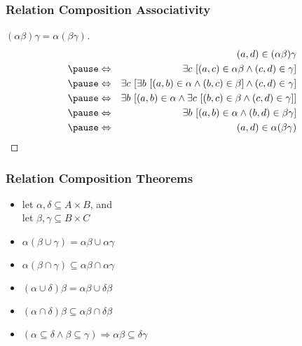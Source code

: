 \documentclass[dvipsnames]{beamer}
\begin{document}
\begin{frame}
  \frametitle{Relation Composition Associativity}

  \begin{proof}[$(\alpha \beta) \gamma = \alpha (\beta \gamma)$]
    \pause
    \begin{eqnarray*}
      &                 & (a,d) \in (\alpha \beta)\gamma\\\pause
      & \Leftrightarrow & \exists c~[(a,c) \in \alpha \beta
                              \wedge (c,d) \in \gamma]\\\pause
      & \Leftrightarrow & \exists c~[\exists b~[(a,b) \in \alpha
                                         \wedge (b,c) \in \beta]
                                         \wedge (c,d) \in \gamma]\\\pause
      & \Leftrightarrow & \exists b~[(a,b) \in \alpha
                              \wedge \exists c~[(b,c) \in \beta
                              \wedge (c,d) \in \gamma]]\\\pause
      & \Leftrightarrow & \exists b~[(a,b) \in \alpha
                              \wedge (b,d) \in \beta \gamma]\\\pause
      & \Leftrightarrow & (a,d) \in \alpha (\beta \gamma)
    \end{eqnarray*}
  \end{proof}
\end{frame}

\begin{frame}
  \frametitle{Relation Composition Theorems}

  \begin{itemize}
    \item let $\alpha , \delta \subseteq A \times B$, and\\
          let $\beta , \gamma \subseteq B \times C$

    \medskip
    \item $\alpha (\beta \cup \gamma) = \alpha \beta \cup \alpha \gamma$

    \item $\alpha (\beta \cap \gamma)
      \subseteq \alpha \beta \cap \alpha \gamma$

    \item $(\alpha \cup \delta) \beta = \alpha \beta \cup \delta \beta$

    \item $(\alpha \cap \delta) \beta
      \subseteq \alpha \beta \cap \delta \beta$

    \item $(\alpha \subseteq \delta \wedge \beta \subseteq \gamma)
      \Rightarrow \alpha \beta \subseteq \delta \gamma$
  \end{itemize}
\end{frame}
\end{document}
